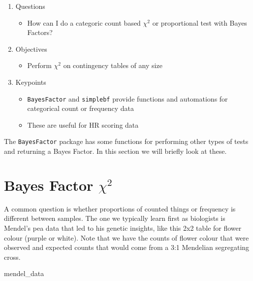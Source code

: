 \documentclass[
]{book}
\newenvironment{Shaded}{\begin{snugshade}}{\end{snugshade}}
\newcommand{\NormalTok}[1]{#1}
\providecommand{\tightlist}{%
  \setlength{\itemsep}{0pt}\setlength{\parskip}{0pt}}
\begin{document}
\begin{enumerate}
\def\labelenumi{\arabic{enumi}.}
\tightlist
\item
  Questions

  \begin{itemize}
  \tightlist
  \item
    How can I do a categoric count based \(\chi^2\) or proportional test with Bayes Factors?
  \end{itemize}
\item
  Objectives

  \begin{itemize}
  \tightlist
  \item
    Perform \(\chi^2\) on contingency tables of any size
  \end{itemize}
\item
  Keypoints

  \begin{itemize}
  \tightlist
  \item
    \texttt{BayesFactor} and \texttt{simplebf} provide functions and automations for categorical count or frequency data
  \item
    These are useful for HR scoring data
  \end{itemize}
\end{enumerate}

The \texttt{BayesFactor} package has some functions for performing other types of tests and returning a Bayes Factor. In this section we will briefly look at these.

\hypertarget{bayes-factor-chi2}{%
\section{\texorpdfstring{Bayes Factor \(\chi^2\)}{Bayes Factor \textbackslash chi\^{}2}}\label{bayes-factor-chi2}}

A common question is whether proportions of counted things or frequency is different between samples. The one we typically learn first as biologists is Mendel's pea data that led to his genetic insights, like this 2x2 table for flower colour (purple or white). Note that we have the counts of flower colour that were observed and expected counts that would come from a 3:1 Mendelian segregating cross.

\begin{Shaded}
\begin{Highlighting}[]
\NormalTok{mendel_data}
\end{Highlighting}
\end{Shaded}
\end{document}
